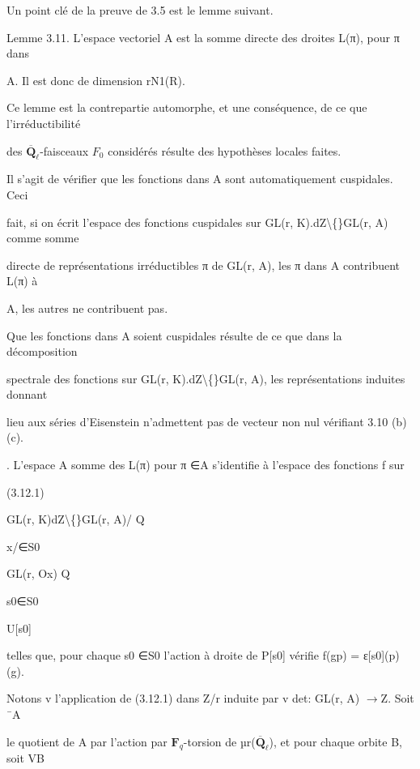 \documentclass[11pt]{article}
\begin{document}
\noindent Un point clé de la preuve de 3.5 est le lemme suivant.\par
\noindent Lemme 3.11. L’espace vectoriel A est la somme directe des droites L(π), pour π dans\par
\noindent A. Il est donc de dimension rN1(R).\par
\noindent Ce lemme est la contrepartie automorphe, et une conséquence, de ce que l’irréductibilité\par
\noindent des \(\overline{\mathbf Q}_{\ell}\)-faisceaux \(F_0\) considérés résulte des hypothèses locales faites.\par
\noindent Il s’agit de vérifier que les fonctions dans A sont automatiquement cuspidales. Ceci\par
\noindent fait, si on écrit l’espace des fonctions cuspidales sur GL(r, K).dZ\textbackslash\{\}GL(r, A) comme somme\par
\noindent directe de représentations irréductibles π de GL(r, A), les π dans A contribuent L(π) à\par
\noindent A, les autres ne contribuent pas.\par
\noindent Que les fonctions dans A soient cuspidales résulte de ce que dans la décomposition\par
\noindent spectrale des fonctions sur GL(r, K).dZ\textbackslash\{\}GL(r, A), les représentations induites donnant\par
\noindent lieu aux séries d’Eisenstein n’admettent pas de vecteur non nul vérifiant 3.10 (b) (c).\par
{}. L’espace A somme des L(π) pour π ∈A s’identifie à l’espace des fonctions f sur\par
\noindent (3.12.1)\par
\noindent GL(r, K)dZ\textbackslash\{\}GL(r, A)/ Q\par
\noindent x/∈S0\par
\noindent GL(r, Ox) Q\par
\noindent s0∈S0\par
\noindent U[s0]\par
\noindent telles que, pour chaque s0 ∈S0 l’action à droite de P[s0] vérifie f(gp) = ε[s0](p)(g).\par
\noindent Notons v l’application de (3.12.1) dans Z/r induite par v det: GL(r, A) \(\to\)Z. Soit ¯A\par
\noindent le quotient de A par l’action par \(\mathbf F_q\)-torsion de µr(\(\overline{\mathbf Q}_{\ell}\)), et pour chaque orbite B, soit VB\par
\end{document}
